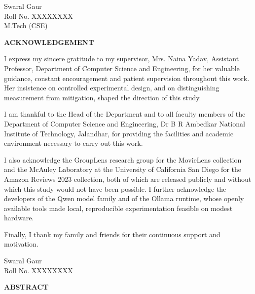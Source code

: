 \documentclass[12pt,a4paper,oneside]{report}
\newcommand{\mynamemixed}{Swaral Gaur}
\newcommand{\myrollno}{XXXXXXXX}          %
\newcommand{\supervisorname}{Mrs. Naina Yadav}
\newcommand{\supervisordesignation}{Assistant Professor}  %
\begin{document}
\vspace{1.0in}

\noindent
\begin{flushright}
\mynamemixed\\
Roll No. \myrollno\\
M.Tech (CSE)
\end{flushright}

\clearpage

\thispagestyle{plain}
\begin{center}
{\large\bfseries ACKNOWLEDGEMENT}
\end{center}
\vspace{0.2in}

I express my sincere gratitude to my supervisor, \supervisorname,
\supervisordesignation, Department of Computer Science and Engineering, for her
valuable guidance, constant encouragement and patient supervision throughout
this work. Her insistence on controlled experimental design, and on
distinguishing measurement from mitigation, shaped the direction of this study.

I am thankful to the Head of the Department and to all faculty members of the
Department of Computer Science and Engineering, Dr B R Ambedkar National
Institute of Technology, Jalandhar, for providing the facilities and academic
environment necessary to carry out this work.

I also acknowledge the GroupLens research group for the MovieLens collection and
the McAuley Laboratory at the University of California San Diego for the Amazon
Reviews 2023 collection, both of which are released publicly and without which
this study would not have been possible. I further acknowledge the developers of
the Qwen model family and of the Ollama runtime, whose openly available tools
made local, reproducible experimentation feasible on modest hardware.

Finally, I thank my family and friends for their continuous support and
motivation.

\vspace{0.6in}

\noindent
\begin{flushright}
\mynamemixed\\
Roll No. \myrollno
\end{flushright}

\clearpage

\thispagestyle{plain}
\begin{center}
{\large\bfseries ABSTRACT}
\end{center}
\vspace{0.2in}
\end{document}
